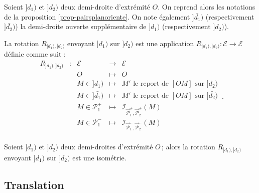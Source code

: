 \begin{defi}[Rotation]
    Soient $]d_1)$ et $]d_2)$ deux demi-droite d'extrémité $O$. On reprend alors les notations de la proposition \ref{prop-pairsplanoriente}. On note également $]\bar{d_1})$ (respectivement $]\bar{d_2})$) la demi-droite ouverte supplémentaire de $]d_1)$ (respectivement $]d_2)$). 

    La rotation $R_{]d_1),]d_2)}$ envoyant $]d_1)$ sur $]d_2)$ est une application $R_{]d_1),]d_2)} : \mathcal{E} \to \mathcal{E}$ définie comme suit :
    \begin{equation*}
        \begin{array}{ccccc}
        R_{]d_1),]d_2)} & : &  \mathcal{E} & \to &  \mathcal{E} \\
         & & O & \mapsto & O \\
         & & M\in ]d_1) & \mapsto & M' \text{ le report de } [OM] \text{ sur } ]d_2) \\
         & & M\in ]\bar{d_1}) & \mapsto & M' \text{ le report de } [OM] \text{ sur } ]\bar{d_2}) \\
        & & M\in \mathcal{P}_1^+ & \mapsto & \mathcal{I}_{\overrightarrow{\mathcal{P}}_1^+,\overrightarrow{\mathcal{P}}_2^+} (M) \\
        & & M\in  \mathcal{P}_1^- & \mapsto & \mathcal{I}_{\overrightarrow{\mathcal{P}}_1^-,\overrightarrow{\mathcal{P}}_2^-} (M) \\
        \end{array}\,.
    \end{equation*}
\end{defi}
\begin{thm}
    Soient $]d_1)$ et $]d_2)$ deux demi-droites d'extrémité $O$\,; alors la rotation $R_{]d_1),]d_2)}$ envoyant $]d_1)$ sur $]d_2)$ est une isométrie. 
\end{thm}

        \subsection{Translation}

